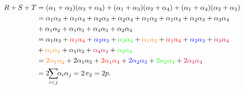 \begin{solution}
  \begin{align*}
  R+S+T
    &= (\alpha_{1}+\alpha_{2})(\alpha_{3}+\alpha_{4})
     +(\alpha_{1}+\alpha_{3})(\alpha_{2}+\alpha_{4})
     +(\alpha_{1}+\alpha_{4})(\alpha_{2}+\alpha_{3})\\
    &= \alpha_{1}\alpha_{3}+\alpha_{1}\alpha_{4} + \alpha_{2}\alpha_{3}+\alpha_{2}\alpha_{4}
      +\alpha_{1}\alpha_{2}+\alpha_{1}\alpha_{4} + \alpha_{2}\alpha_{3}+\alpha_{3}\alpha_{4} \\&+ \alpha_{1}\alpha_{2}+\alpha_{1}\alpha_{3} + \alpha_{4}\alpha_{3}+\alpha_{2}\alpha_{4}\\
    &= 
\alpha_{1}\alpha_{3}
+ \textcolor{red}{\alpha_{1}\alpha_{4}}
+ \textcolor{blue}{\alpha_{2}\alpha_{3}}
+ \textcolor{green}{\alpha_{2}\alpha_{4}}
+ \textcolor{orange}{\alpha_{1}\alpha_{2}}
+ \textcolor{red}{\alpha_{1}\alpha_{4}}
+ \textcolor{blue}{\alpha_{2}\alpha_{3}}
+ \textcolor{purple}{\alpha_{3}\alpha_{4}}\\
&+ \textcolor{orange}{\alpha_{1}\alpha_{2}}
+ {\alpha_{1}\alpha_{3}}
+ \textcolor{
  purple}{\alpha_{4}\alpha_{3}}
+ \textcolor{green}{\alpha_{2}\alpha_{4}}\\
    &= \textcolor{orange}{2 \alpha_1 \alpha_2}+2 \alpha_1 \alpha_3+\textcolor{red}{2\alpha_1 \alpha_4}+\textcolor{blue}{2 \alpha_2 \alpha_3}+\textcolor{green}{2\alpha_2 \alpha_4}+\textcolor{purple}{2 \alpha_3 \alpha_4}\\
    &= 2\!\!\sum_{i<j}\!\!\alpha_i\alpha_j
     = 2\,e_{2}=2p.
  \end{align*}  
  
  
  
  

\end{solution}
